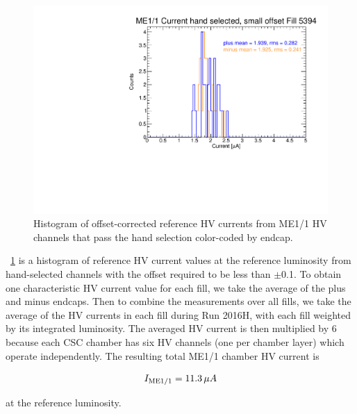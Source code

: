 \begin{figure}
	\centering
	\includegraphics[width=\dummyFigWidth]{figures/neutron/me11_fill_5394_a_sel_slope_hist.pdf}
  \caption[Histogram of offset-corrected reference HV currents from ME1/1 HV channels.]{Histogram of offset-corrected reference HV currents from ME1/1 HV channels that pass the hand selection color-coded by endcap.}
	\label{fig:fill_5394_curr_histo}
\end{figure}

\Fig~\ref{fig:fill_5394_curr_histo} is a histogram of reference HV current values at the reference luminosity from hand-selected channels with the offset required to be less than $\pm$0.1\muA. To obtain one characteristic HV current value for each fill, we take the average of the plus and minus endcaps. Then to combine the measurements over all fills, we take the average of the HV currents in each fill during Run 2016H, with each fill weighted by its integrated luminosity. The averaged HV current is then multiplied by 6 because each CSC chamber has six HV channels (one per chamber layer) which operate independently. The resulting total ME1/1 chamber HV current is 

\begin{equation}
	I_{\text{ME1/1}} = 11.3\,\mu A
\end{equation}

at the reference luminosity.

